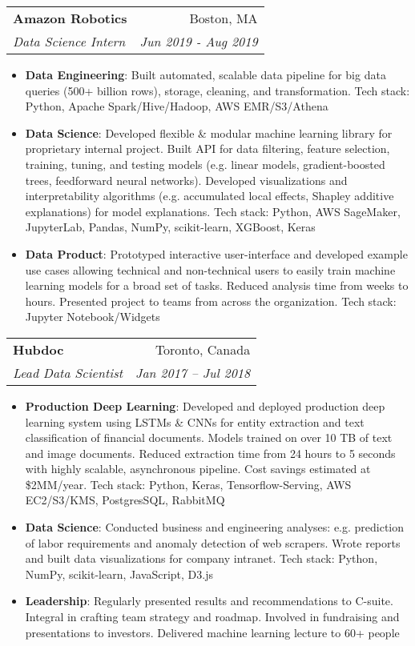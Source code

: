 \documentclass[letterpaper,11pt]{article}
\makeatletter
\newcommand{\resumeItem}[2]{
  \item\small{
    \textbf{#1}{: #2 \vspace{-2pt}}
  }
}
\newcommand{\resumeSubheading}[4]{
  \vspace{-1pt}\item
    \begin{tabular*}{0.97\textwidth}[t]{l@{\extracolsep{\fill}}r}
      \textbf{#1} & #2 \\
      \textit{\small#3} & \textit{\small #4} \\
    \end{tabular*}\vspace{-5pt}
}
\newcommand{\resumeItemListStart}{\begin{itemize}}
\newcommand{\resumeItemListEnd}{\end{itemize}\vspace{-5pt}}
\makeatother
\begin{document}
  \resumeSubheading
    {Amazon Robotics}{Boston, MA}
    {Data Science Intern}{Jun 2019 - Aug 2019}
    \resumeItemListStart
      \resumeItem{Data Engineering}
        {Built automated, scalable data pipeline for big data queries (500+ billion rows), storage, cleaning,
        and transformation. Tech stack: Python, Apache Spark/Hive/Hadoop, AWS EMR/S3/Athena}
      \resumeItem{Data Science}
        {Developed flexible \& modular machine learning library for proprietary internal project. Built API for data filtering,
        feature selection, training, tuning, and testing models (e.g. linear models, gradient-boosted trees, feedforward neural networks).
        Developed visualizations and interpretability algorithms (e.g. accumulated local effects, Shapley additive explanations)
        for model explanations. Tech stack: Python, AWS SageMaker, JupyterLab, Pandas, NumPy, scikit-learn, XGBoost, Keras}
      \resumeItem{Data Product}
        {Prototyped interactive user-interface and developed example use cases allowing technical and non-technical
        users to easily train machine learning models for a broad set of tasks. Reduced analysis time from weeks to hours.
        Presented project to teams from across the organization. Tech stack: Jupyter Notebook/Widgets}
    \resumeItemListEnd

    \resumeSubheading
      {Hubdoc}{Toronto, Canada}
      {Lead Data Scientist}{Jan 2017 -- Jul 2018}
      \resumeItemListStart
        \resumeItem{Production Deep Learning}
          {Developed and deployed production deep learning system using LSTMs \& CNNs for entity extraction and
          text classification of financial documents. Models trained on over 10 TB of text and image documents.
          Reduced extraction time from 24 hours to 5 seconds with highly scalable, asynchronous pipeline. Cost savings
          estimated at \$2MM/year. Tech stack: Python, Keras, Tensorflow-Serving, AWS EC2/S3/KMS, PostgresSQL, RabbitMQ}
        \resumeItem{Data Science}
          {Conducted business and engineering analyses: e.g. prediction of labor requirements and anomaly detection of web
          scrapers. Wrote reports and built data visualizations for company intranet. Tech stack: Python, NumPy, scikit-learn,
          JavaScript, D3.js}
        \resumeItem{Leadership}
          {Regularly presented results and recommendations to C-suite. Integral in crafting team strategy and
          roadmap. Involved in fundraising and presentations to investors. Delivered machine learning lecture to 60+ people}
      \resumeItemListEnd
\end{document}
